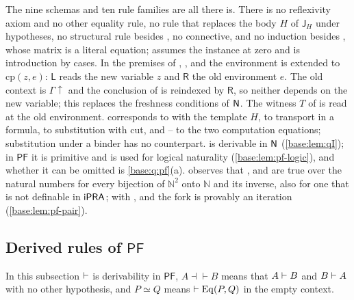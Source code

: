 \begin{remark}
\label{base:rem:pf-inventory}
The nine schemas and ten rule families are all there is.  There is no
reflexivity axiom and no other equality rule, no rule that replaces the
body $H$ of $\mathsf J_H$ under hypotheses, no structural rule besides
, no connective, and no induction besides ,
whose matrix is a literal equation;  assumes the instance at
zero and is introduction by cases.  In the premises of ,
,  and  the environment is
extended to $\mathrm{cp}(z,e)$: $\mathsf L$ reads the new variable $z$ and
$\mathsf R$ the old environment $e$.  The old context is $\Gamma{\uparrow}$
and the conclusion of  is reindexed by $\mathsf R$, so neither
depends on the new variable; this replaces the freshness conditions of
$\mathsf{N}$.  The witness $T$ of  is read at the old environment.
 corresponds to  with the template $H$,
 to transport in a formula,  to
substitution with cut, and -- to the two
computation equations; substitution under a binder has no counterpart.
 is derivable in $\mathsf{N}$ (\cref{base:lem:qI}); in $\mathsf{PF}$
it is primitive and is used for logical naturality
(\cref{base:lem:pf-logic}), and whether it can be omitted is
\cref{base:q:pf}(a).   observes that ,
 and  are true over the natural numbers for every
bijection of $\mathbb N^2$ onto $\mathbb N$ and its inverse, also for one
that is not definable in $\mathsf{iPRA}$; with ,  and
 the fork is provably an iteration (\cref{base:lem:pf-pair}).
\end{remark}

\subsection{Derived rules of \texorpdfstring{$\mathsf{PF}$}{PF}}
\label{base:sec:pfderived}

In this subsection $\vdash$ is derivability in $\mathsf{PF}$,
$A\dashv\vdash B$ means that $A\vdash B$ and $B\vdash A$ with no other
hypothesis, and $P\simeq Q$ means $\vdash\mathrm{Eq}(P,Q)$ in the empty
context.

